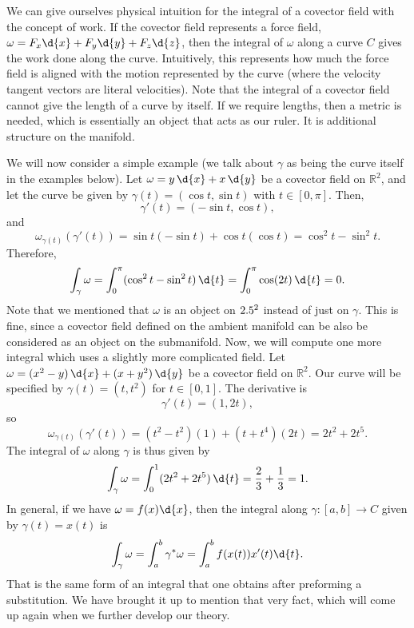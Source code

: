 \documentclass[a4paper,12pt]{article}
\begin{document}
We can give ourselves physical intuition for the integral of a covector field with the concept of work.
If the covector field represents a force field, $\omega = F_x \d{x} + F_y \d{y} + F_z \d{z}$, then the integral of $\omega$ along a curve $C$ gives the work done along the curve.
Intuitively, this represents how much the force field is aligned with the motion represented by the curve (where the velocity tangent vectors are literal velocities).
Note that the integral of a covector field cannot give the length of a curve by itself.
If we require lengths, then a metric is needed, which is essentially an object that acts as our ruler.
It is additional structure on the manifold.

We will now consider a simple example (we talk about $\gamma$ as being the curve itself in the examples below).
Let $\omega = y\,\d{x} + x\,\d{y}$ be a covector field on $\mathbb{R}^2$, and let the curve be given by $\gamma(t) = (\cos t, \sin t)$ with $t \in [0,\pi]$.
Then,
\begin{equation*}
\gamma'(t) = (-\sin t, \cos t),
\end{equation*}
and
\begin{equation*}
\omega_{\gamma(t)}(\gamma'(t))
= \sin t(-\sin t) + \cos t(\cos t)
= \cos^2 t - \sin^2 t.
\end{equation*}
Therefore,
\begin{equation*}
\int_\gamma \omega = \int_0^\pi (\cos^2 t - \sin^2 t)\,\d{t} = \int_0^\pi \cos(2t)\,\d{t} = 0.
\end{equation*}
Note that we mentioned that $\omega$ is an object on $2.5^2$ instead of just on $\gamma$.
This is fine, since a covector field defined on the ambient manifold can be also be considered as an object on the submanifold.
Now, we will compute one more integral which uses a slightly more complicated field.
Let $\omega = (x^2 - y)\,\d{x} + (x + y^2)\,\d{y}$ be a covector field on $\mathbb{R}^2$.
Our curve will be specified by $\gamma(t) = (t, t^2)$ for $t \in [0,1]$.
The derivative is
\begin{equation*}
\gamma'(t) = (1, 2t),
\end{equation*}
so
\begin{equation*}
\omega_{\gamma(t)}(\gamma'(t)) = (t^2 - t^2)(1) + (t + t^4)(2t) = 2t^2 + 2t^5.
\end{equation*}
The integral of $\omega$ along $\gamma$ is thus given by
\begin{equation*}
\int_\gamma \omega
= \int_0^1 (2t^2 + 2t^5)\,\d{t}
= \frac{2}{3} + \frac{1}{3}
= 1.
\end{equation*}
In general, if we have $\omega = f(x) \d{x}$, then the integral along $\gamma \colon [a,b] \to C$ given by $\gamma(t) = x(t)$ is
\begin{equation*}
    \int_\gamma \omega = \int_a^b \gamma^* \omega = \int_a^b f(x(t)) x'(t) \d{t}.
\end{equation*}
That is the same form of an integral that one obtains after preforming a substitution.
We have brought it up to mention that very fact, which will come up again when we further develop our theory.
\end{document}
